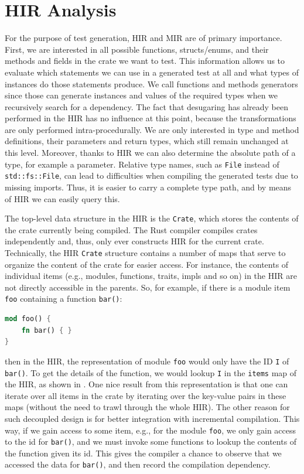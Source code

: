\documentclass[paper=a4,%
  twoside,%
  BCOR4mm,%
  abstract=true,%
  toc=bibliography,%
  chapterprefix=true,%
  toc=bibliographynumbered,%
  open=right,%
  english,%
  pagesize=pdftex]{scrreprt}
\begin{document}
\section{HIR Analysis}
For the purpose of test generation, \ac{HIR} and \ac{MIR} are of primary importance. First, we are interested in all possible functions, structs/enums, and their methods and fields in the crate we want to test. This information allows us to evaluate which statements we can use in a generated test at all and what types of instances do those statements produce. We call functions and methods generators since those can generate instances and values of the required types when we recursively search for a dependency. The fact that desugaring has already been performed in the \ac{HIR} has no influence at this point, because the transformations are only performed intra-procedurally. We are only interested in type and method definitions, their parameters and return types, which still remain unchanged at this level. Moreover, thanks to \ac{HIR} we can also determine the absolute path of a type, for example a parameter. Relative type names, such as \lstinline{File} instead of \lstinline{std::fs::File}, can lead to difficulties when compiling the generated tests due to missing imports. Thus, it is easier to carry a complete type path, and by means of \ac{HIR} we can easily query this.

The top-level data structure in the \ac{HIR} is the \lstinline{Crate}, which stores the contents of the crate currently being compiled. The Rust compiler compiles crates independently and, thus, only ever constructs \ac{HIR} for the current crate. Technically, the \ac{HIR} \lstinline{Crate} structure contains a number of maps that serve to organize the content of the crate for easier access. For instance, the contents of individual items (e.g., modules, functions, traits, impls and so on) in the \ac{HIR} are not directly accessible in the parents. So, for example, if there is a module item \lstinline{foo} containing a function \lstinline{bar()}:

\begin{lstlisting}[language=Rust, style=boxed, caption={}]
mod foo() {
    fn bar() { }
}
\end{lstlisting}
then in the \ac{HIR}, the representation of module \lstinline{foo} would only have the ID \lstinline{I} of \lstinline{bar()}. To get the details of the function, we would lookup \lstinline{I} in the \lstinline{items} map of the \ac{HIR}, as shown in . One nice result from this representation is that one can iterate over all items in the crate by iterating over the key-value pairs in these maps (without the need to trawl through the whole \ac{HIR}). The other reason for such decoupled design is for better integration with incremental compilation. This way, if we gain access to some item, e.g., for the module \lstinline{foo}, we only gain access to the id for \lstinline{bar()}, and we must invoke some functions to lookup the contents of the function given its id. This gives the compiler a chance to observe that we accessed the data for \lstinline{bar()}, and then record the compilation dependency.
\end{document}

